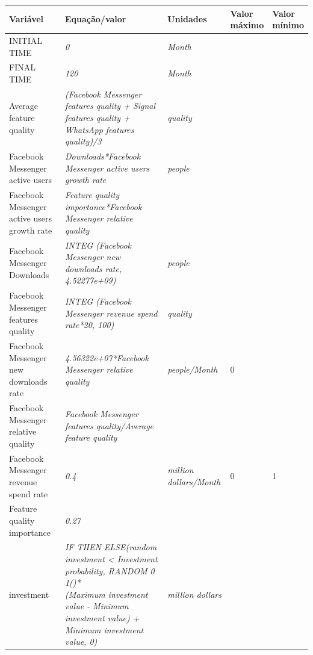 \begin{table}[h]

   \centering
   \begin{adjustbox}{width=1\textwidth}
   \begin{tabular}{|l|l|l|l|l|}
   \hline
   \textbf{Variável} & \textbf{Equação/valor} & \textbf{Unidades} & \makecell{\textbf{Valor} \\ \textbf{máximo}} & \makecell{\textbf{Valor} \\ \textbf{mínimo}} \\
   \hline
   INITIAL TIME & \textit{0} & \textit{Month} &  &  \\\hline
   FINAL TIME & \textit{120} & \textit{Month} &  &  \\\hline
   Average feature quality & \makecell[l]{\textit{(Facebook Messenger features quality + Signal features quality +} \\ \textit{WhatsApp features quality)/3}} & \textit{quality} &  &  \\\hline
   Facebook Messenger active users & \textit{Downloads*Facebook Messenger active users growth rate} & \textit{people}  &  &  \\\hline
   Facebook Messenger active users growth rate & \textit{Feature quality importance*Facebook Messenger relative quality} &  &  &  \\\hline
   Facebook Messenger Downloads & \textit{INTEG (Facebook Messenger new downloads rate, 4.52277e+09)} & \textit{people} &  &  \\\hline
   Facebook Messenger features quality & \textit{INTEG (Facebook Messenger revenue spend rate*20, 100)} & \textit{quality} &  &  \\\hline
   Facebook Messenger new downloads rate & \textit{4.56322e+07*Facebook Messenger relative quality} & \textit{people/Month} & 0 &  \\\hline
   Facebook Messenger relative quality & \textit{Facebook Messenger features quality/Average feature quality} &  &  &  \\\hline
   Facebook Messenger revenue spend rate & \textit{0.4} & \textit{million dollars/Month} & 0 & 1 \\\hline
   Feature quality importance & \textit{0.27} &  &  &  \\\hline
   investment & \makecell[l]{\textit{IF THEN ELSE(random investment < Investment probability, RANDOM 0 1()*} \\ \textit{(Maximum investment value - Minimum investment value) + } \\ \textit{Minimum investment value, 0)}} & \textit{million dollars} &  &  \\\hline

\end{tabular}
\end{adjustbox}
\end{table}

